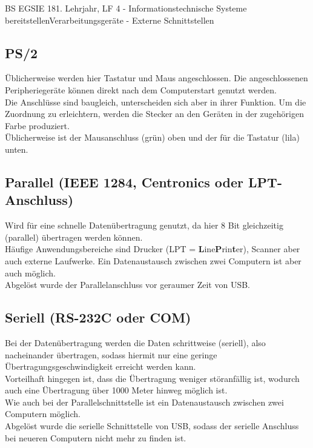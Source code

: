 \documentclass[11pt,oneside,twocolumn,openany,headings=optiontotoc,11pt,numbers=noenddot]{article}
\begin{document}
	\begin{worksheet}{BS EGSIE 18}{1. Lehrjahr, LF 4 - Informationstechnische Systeme bereitstellen}{Verarbeitungsgeräte - Externe Schnittstellen}
		\onehalfspacing
		\subsection*{PS/2}
		Üblicherweise werden hier Tastatur und Maus angeschlossen. Die angeschlossenen Peripheriegeräte können direkt nach dem Computerstart genutzt werden.\\
		Die Anschlüsse sind baugleich, unterscheiden sich aber in ihrer Funktion. Um die Zuordnung zu erleichtern, werden die Stecker an den Geräten in der zugehörigen Farbe produziert.\\
		Üblicherweise ist der Mausanschluss (grün) oben und der für die Tastatur (lila) unten.
		\subsection*{Parallel (IEEE 1284, Centronics oder LPT-Anschluss)}
		Wird für eine schnelle Datenübertragung genutzt, da hier 8 Bit gleichzeitig (parallel) übertragen werden können.\\
		Häufige Anwendungsbereiche sind Drucker (LPT = \textbf{L}ine\textbf{P}rin\textbf{t}er), Scanner aber auch externe Laufwerke. Ein Datenaustausch zwischen zwei Computern ist aber auch möglich.\\
		\footnotesize{Abgelöst wurde der Parallelanschluss vor geraumer Zeit von USB.}\normalsize
		\subsection*{Seriell (RS-232C oder COM)}
		Bei der Datenübertragung werden die Daten schrittweise (seriell), also nacheinander übertragen, sodass hiermit nur eine geringe Übertragungsgeschwindigkeit erreicht werden kann.\\
		Vorteilhaft hingegen ist, dass die Übertragung weniger störanfällig ist, wodurch auch eine Übertragung über 1000 Meter hinweg möglich ist.\\
		Wie auch bei der Parallelschnittstelle ist ein Datenaustausch zwischen zwei Computern möglich.\\
		\footnotesize{Abgelöst wurde die serielle Schnittstelle von USB, sodass der serielle Anschluss bei neueren Computern nicht mehr zu finden ist.}\normalsize

\end{worksheet}
\end{document}

